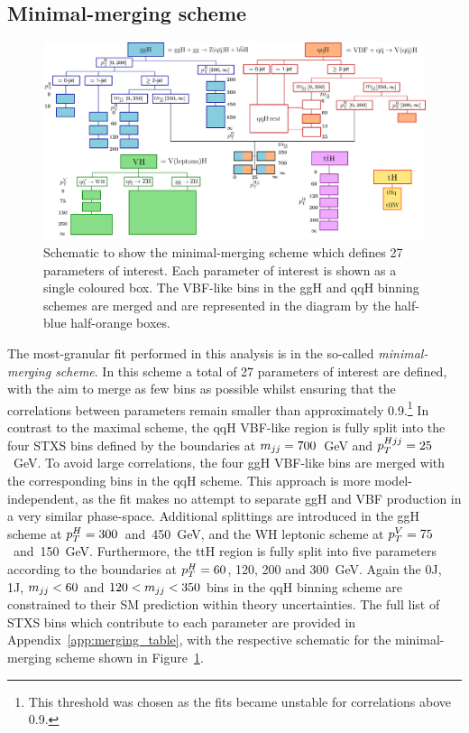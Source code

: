 \FloatBarrier

\subsection{Minimal-merging scheme}
\begin{figure}
  \centering
  \includegraphics[width=.9\linewidth]{Figures/app_merging_schemes/allSTXSbins_minimal.pdf}
  \caption[Schematic of the minimal-merging scheme]
  {
    Schematic to show the minimal-merging scheme which defines 27 parameters of interest. Each parameter of interest is shown as a single coloured box. The VBF-like bins in the ggH and qqH binning schemes are merged and are represented in the diagram by the half-blue half-orange boxes.
  }
  \label{fig:minimal_scheme}
\end{figure}

The most-granular fit performed in this analysis is in the so-called \textit{minimal-merging scheme}. In this scheme a total of 27 parameters of interest are defined, with the aim to merge as few bins as possible whilst ensuring that the correlations between parameters remain smaller than approximately 0.9.\footnote{This threshold was chosen as the fits became unstable for correlations above 0.9.}  In contrast to the maximal scheme, the qqH VBF-like region is fully split into the four STXS bins defined by the boundaries at ${m_{jj}=700}$~GeV and $p_T^{Hjj}=25$~GeV. To avoid large correlations, the four ggH VBF-like bins are merged with the corresponding bins in the qqH scheme. This approach is more model-independent, as the fit makes no attempt to separate ggH and VBF production in a very similar phase-space. Additional splittings are introduced in the ggH scheme at $p_T^H=300$~and~450~GeV, and the WH leptonic scheme at $p_T^V=75$~and~150~GeV. Furthermore, the ttH region is fully split into five parameters according to the boundaries at $p_T^H=60$, 120, 200 and 300~GeV. Again the 0J, 1J, $m_{jj}<60$ and $120<m_{jj}<350$ bins in the qqH binning scheme are constrained to their SM prediction within theory uncertainties. The full list of STXS bins which contribute to each parameter are provided in Appendix~\ref{app:merging_table}, with the respective schematic for the minimal-merging scheme shown in Figure~\ref{fig:minimal_scheme}.

